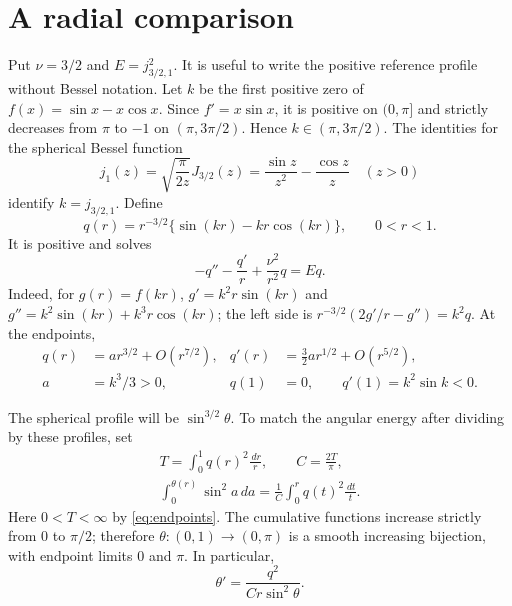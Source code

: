 \documentclass[11pt]{article}
\newcommand{\dd}{\,d}
\begin{document}
\section{A radial comparison}
Put $\nu=3/2$ and $E=j_{3/2,1}^2$. It is useful to write the positive
reference profile without Bessel notation. Let $k$ be the first positive
zero of $f(x)=\sin x-x\cos x$. Since $f'=x\sin x$, it is positive on
$(0,\pi]$ and strictly decreases from $\pi$ to $-1$ on
$(\pi,3\pi/2)$. Hence $k\in(\pi,3\pi/2)$.
The identities for the spherical Bessel function
\[
 j_1(z)=\sqrt{\frac{\pi}{2z}}J_{3/2}(z)
       =\frac{\sin z}{z^2}-\frac{\cos z}{z}
 \quad(z>0)
\]
\cite[10.47.3 and 10.49.3]{DLMF} identify $k=j_{3/2,1}$.
Define
\begin{equation}\label{eq:q}
 q(r)=r^{-3/2}\{\sin(kr)-kr\cos(kr)\},\qquad 0<r<1.
\end{equation}
It is positive and solves
\begin{equation}\label{eq:diskode}
 -q''-\frac{q'}r+\frac{\nu^2}{r^2}q=Eq.
\end{equation}
Indeed, for $g(r)=f(kr)$, $g'=k^2r\sin(kr)$ and
$g''=k^2\sin(kr)+k^3r\cos(kr)$; the left side is
$r^{-3/2}(2g'/r-g'')=k^2q$. At the endpoints,
\begin{equation}\label{eq:endpoints}
 \begin{aligned}
 q(r)&=a r^{3/2}+O(r^{7/2}),&
 q'(r)&=\tfrac32a r^{1/2}+O(r^{5/2}),\\
 a&=k^3/3>0,& q(1)&=0,\qquad q'(1)=k^2\sin k<0.
 \end{aligned}
\end{equation}

The spherical profile will be $\sin^{3/2}\theta$. To match the angular
energy after dividing by these profiles, set
\begin{equation}\label{eq:massmap}
 \begin{gathered}
 T=\int_0^1q(r)^2\frac{\dd r}{r},\qquad C=\frac{2T}{\pi},\\
 \int_0^{\theta(r)}\sin^2 a\dd a
       =\frac1C\int_0^r q(t)^2\frac{\dd t}{t}.
 \end{gathered}
\end{equation}
Here $0<T<\infty$ by \eqref{eq:endpoints}.
The cumulative functions increase strictly from $0$ to $\pi/2$;
therefore $\theta:(0,1)\to(0,\pi)$ is a smooth increasing bijection,
with endpoint limits $0$ and $\pi$. In particular,
\begin{equation}\label{eq:thetader}
 \theta'=\frac{q^2}{Cr\sin^2\theta}.
\end{equation}
\end{document}
